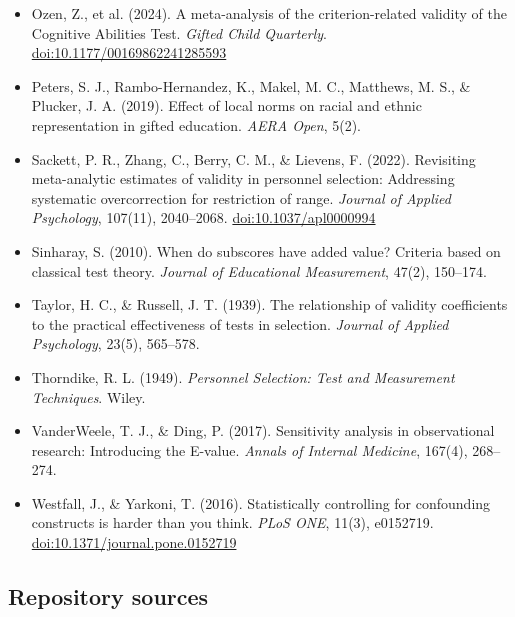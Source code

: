 \begin{itemize}[leftmargin=1.2em,itemsep=0.25em,label={}]
\item Ozen, Z., et al. (2024). A meta-analysis of the criterion-related validity
of the Cognitive Abilities Test. \textit{Gifted Child Quarterly}.
\href{https://doi.org/10.1177/00169862241285593}{doi:10.1177/00169862241285593}

\item Peters, S. J., Rambo-Hernandez, K., Makel, M. C., Matthews, M. S., \&
Plucker, J. A. (2019). Effect of local norms on racial and ethnic representation
in gifted education. \textit{AERA Open}, 5(2).

\item Sackett, P. R., Zhang, C., Berry, C. M., \& Lievens, F. (2022).
Revisiting meta-analytic estimates of validity in personnel selection:
Addressing systematic overcorrection for restriction of range.
\textit{Journal of Applied Psychology}, 107(11), 2040--2068.
\href{https://doi.org/10.1037/apl0000994}{doi:10.1037/apl0000994}

\item Sinharay, S. (2010). When do subscores have added value? Criteria based on
classical test theory. \textit{Journal of Educational Measurement}, 47(2),
150--174.

\item Taylor, H. C., \& Russell, J. T. (1939). The relationship of validity
coefficients to the practical effectiveness of tests in selection.
\textit{Journal of Applied Psychology}, 23(5), 565--578.

\item Thorndike, R. L. (1949). \textit{Personnel Selection: Test and Measurement
Techniques}. Wiley.

\item VanderWeele, T. J., \& Ding, P. (2017). Sensitivity analysis in
observational research: Introducing the E-value.
\textit{Annals of Internal Medicine}, 167(4), 268--274.

\item Westfall, J., \& Yarkoni, T. (2016). Statistically controlling for
confounding constructs is harder than you think.
\textit{PLoS ONE}, 11(3), e0152719.
\href{https://doi.org/10.1371/journal.pone.0152719}{doi:10.1371/journal.pone.0152719}

\end{itemize}

\normalsize

\subsection*{Repository sources}

